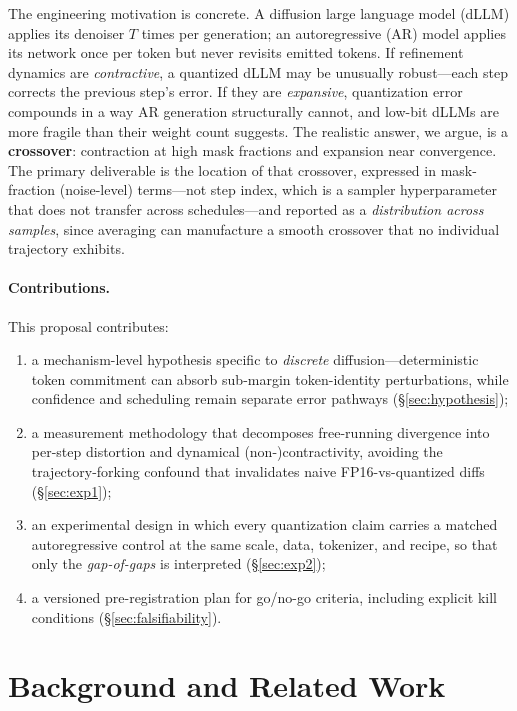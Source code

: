 \documentclass[11pt]{article}
\begin{document}
The engineering motivation is concrete. A diffusion large language model (dLLM) applies its denoiser $T$ times per generation; an autoregressive (AR) model applies its network once per token but never revisits emitted tokens. If refinement dynamics are \emph{contractive}, a quantized dLLM may be unusually robust---each step corrects the previous step's error. If they are \emph{expansive}, quantization error compounds in a way AR generation structurally cannot, and low-bit dLLMs are more fragile than their weight count suggests. The realistic answer, we argue, is a \textbf{crossover}: contraction at high mask fractions and expansion near convergence. The primary deliverable is the location of that crossover, expressed in mask-fraction (noise-level) terms---not step index, which is a sampler hyperparameter that does not transfer across schedules---and reported as a \emph{distribution across samples}, since averaging can manufacture a smooth crossover that no individual trajectory exhibits.

\paragraph{Contributions.} This proposal contributes:
\begin{enumerate}
\item a mechanism-level hypothesis specific to \emph{discrete} diffusion---deterministic token commitment can absorb sub-margin token-identity perturbations, while confidence and scheduling remain separate error pathways (\S\ref{sec:hypothesis});
\item a measurement methodology that decomposes free-running divergence into per-step distortion and dynamical (non-)contractivity, avoiding the trajectory-forking confound that invalidates naive FP16-vs-quantized diffs (\S\ref{sec:exp1});
\item an experimental design in which every quantization claim carries a matched autoregressive control at the same scale, data, tokenizer, and recipe, so that only the \emph{gap-of-gaps} is interpreted (\S\ref{sec:exp2});
\item a versioned pre-registration plan for go/no-go criteria, including explicit kill conditions (\S\ref{sec:falsifiability}).
\end{enumerate}

\section{Background and Related Work}
\label{sec:related}
\end{document}
